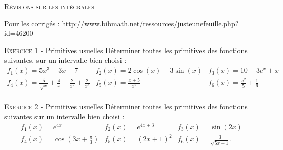 
\newcommand{\mtn}{\mathbb{N}}
\newcommand{\mtns}{\mathbb{N}^*}
\newcommand{\mtz}{\mathbb{Z}}
\newcommand{\mtr}{\mathbb{R}}
\newcommand{\mtk}{\mathbb{K}}
\newcommand{\mtq}{\mathbb{Q}}
\newcommand{\mtc}{\mathbb{C}}
\newcommand{\mch}{\mathcal{H}}
\newcommand{\mcp}{\mathcal{P}}
\newcommand{\mcb}{\mathcal{B}}
\newcommand{\mcl}{\mathcal{L}}
\newcommand{\mcm}{\mathcal{M}}
\newcommand{\mcc}{\mathcal{C}}
\newcommand{\mcmn}{\mathcal{M}}
\newcommand{\mcmnr}{\mathcal{M}_n(\mtr)}
\newcommand{\mcmnk}{\mathcal{M}_n(\mtk)}
\newcommand{\mcsn}{\mathcal{S}_n}
\newcommand{\mcs}{\mathcal{S}}
\newcommand{\mcd}{\mathcal{D}}
\newcommand{\mcsns}{\mathcal{S}_n^{++}}
\newcommand{\glnk}{GL_n(\mtk)}
\newcommand{\mnr}{\mathcal{M}_n(\mtr)}
\DeclareMathOperator{\ch}{ch}
\DeclareMathOperator{\sh}{sh}
\DeclareMathOperator{\vect}{vect}
\DeclareMathOperator{\card}{card}
\DeclareMathOperator{\comat}{comat}
\DeclareMathOperator{\imv}{Im}
\DeclareMathOperator{\rang}{rg}
\DeclareMathOperator{\Fr}{Fr}
\DeclareMathOperator{\diam}{diam}
\DeclareMathOperator{\supp}{supp}
\newcommand{\veps}{\varepsilon}
\newcommand{\mcu}{\mathcal{U}}
\newcommand{\mcun}{\mcu_n}
\newcommand{\dis}{\displaystyle}
\newcommand{\croouv}{[\![}
\newcommand{\crofer}{]\!]}
\newcommand{\rab}{\mathcal{R}(a,b)}
\newcommand{\pss}[2]{\langle #1,#2\rangle}

 

\begin{center}\textsc{{\huge Révisions sur les intégrales}}\end{center}



Pour les corrigés : http://www.bibmath.net/ressources/justeunefeuille.php?id=46200 



\vskip0.3cm\noindent\textsc{Exercice 1} - Primitives usuelles
\vskip0.2cm
Déterminer toutes les primitives des fonctions suivantes, sur un intervalle bien choisi : 
$$\begin{array}{lll}
\displaystyle f_1(x)=5x^3-3x+7&\displaystyle f_2(x)=2\cos(x)-3\sin(x)&\displaystyle f_3(x)=10-3e^x+x\\
\displaystyle f_4(x)=\frac{5}{\sqrt x}+\frac 4x+\frac{2}{x^2}+\frac{2}{x^3}&\displaystyle f_5(x)=\frac{x+5}{x^2}&\displaystyle f_6(x)=\frac{x^2}{5}+\frac 1{6}\\
\end{array}$$




\vskip0.3cm\noindent\textsc{Exercice 2} - Primitives usuelles
\vskip0.2cm
Déterminer toutes les primitives des fonctions suivantes sur un intervalle bien choisi : 
$$\begin{array}{lll}
\displaystyle f_1(x)=e^{4x}&\displaystyle f_2(x)=e^{4x+3}& \displaystyle f_3(x)=\sin(2x)\\
\displaystyle f_4(x)=\cos\left(3x+\frac\pi 3\right)&
\displaystyle f_5(x)=(2x+1)^2&\displaystyle f_6(x)=\frac{3}{\sqrt{5x+1}}.
\end{array}$$



